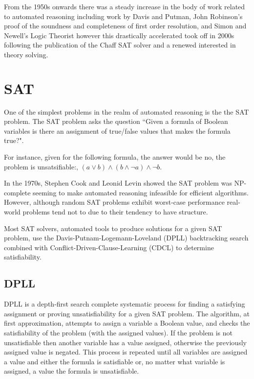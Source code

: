 \documentclass[]{final_report}
\begin{document}
From the 1950s onwards there was a steady increase in the body of work related to automated reasoning including work by Davis and Putman, John Robinson's proof of the soundness and completeness of first order resolution, and Simon and Newell's Logic Theorist however this drastically accelerated took off in 2000s following the publication of the Chaff SAT solver and a renewed interested in theory solving. ~\cite{excapebarrettriseofsmt}

\section{SAT}
One of the simplest problems in the realm of automated reasoning is the the SAT problem. The SAT problem asks the question ``Given a formula of Boolean variables is there an assignment of true/false values that makes the formula true?".  ~\cite{smtwheredowegofromhere}

For instance, given for the following formula, the answer would be no, the problem is unsatsifiable:,  $(a \lor b) \land (b \land \lnot a) \land \lnot b $.

In the 1970s, Stephen Cook and Leonid Levin showed the SAT problem was NP-complete seeming to make automated reasoning infeasible for efficient algorithms. However, although random SAT problems exhibit worst-case performance real-world problems tend not to due to their tendency to have structure.  ~\cite{smtwheredowegofromhere}

Most SAT solvers, automated tools to produce solutions for a given SAT problem, use the Davis-Putnam-Logemann-Loveland (DPLL) backtracking search combined with Conflict-Driven-Clause-Learning (CDCL) to determine satisfiability. ~\cite{zhang2001efficient} ~\cite{gomes2008satisfiability}

\subsection{DPLL}
DPLL is a depth-first search complete systematic process for finding a satisfying assignment or proving unsatisfiability for a given SAT problem.  The algorithm, at first approximation, attempts to assign a variable a Boolean value, and checks the satisfiability of the problem (with the assigned values). If the problem is not unsatisfiable then another variable has a value assigned, otherwise the previously assigned value is negated. This process is repeated until all variables are assigned a value and either the formula is satisfiable or, no matter what variable is assigned, a value the formula is unsatisfiable. ~\cite{sattosmt}
\end{document}
